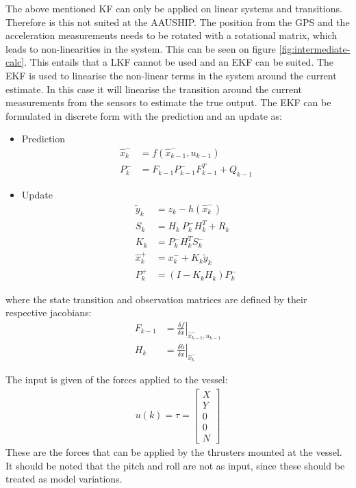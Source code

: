 The above mentioned \ac{KF} can only be applied on linear systems and transitions. Therefore is this not suited at the AAUSHIP. The position from the \ac{GPS} and the acceleration measurements needs to be rotated with a rotational matrix, which leads to non-linearities in the system. This can be seen on figure \vref{fig:intermediate-calc}. This entails that a \ac{LKF} cannot be used and an \ac{EKF} can be suited. The \ac{EKF} is used to linearise the non-linear terms in the system around the current estimate. In this case it will linearise the transition around the current measurements from the sensors to estimate the true output. The \ac{EKF} can be formulated in discrete form with the prediction and an update as:
\begin{itemize}
\item Prediction
\begin{align}
\hat x_k^- &= f(\hat x_{k-1}^-,u_{k-1})\\
P_k^- &= F_{k-1}P_{k-1}^-F_{k-1}^T+Q_{k-1}
\end{align}

\item Update
\begin{align}
\tilde y_k &= z_k - h(\hat x_k^-)\\
S_k &= H_k\ P_k^-H_k^T + R_k\\
K_k &= P_k^-H_k^TS_k^-\\
\hat x_k^+ &= x_k^- + K_k \tilde y_k\\
P_k^+ &= (I - K_k H_k) P_k^-
\end{align}
\end{itemize}
where the state transition and observation matrices are defined by their respective jacobians:
\begin{align}
F_{k-1} &= \left.\frac{\delta f}{\delta x}\right|_{\hat x_{k-1}^-,u_{k-1}}\\
H_k &= \left.\frac{\delta h}{\delta x}\right|_{\hat x_{k}^-}
\end{align}

The input is given of the forces applied to the vessel:
\begin{align}
u(k) = \tau =
\begin{bmatrix}
X\\
Y\\
0\\
0\\
N
\end{bmatrix}
\end{align}
These are the forces that can be applied by the thrusters mounted at the vessel. It should be noted that the pitch and roll are not as input, since these should be treated as model variations.


